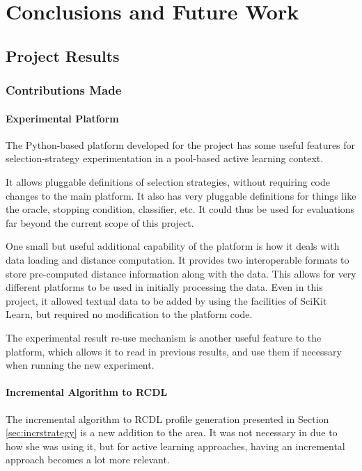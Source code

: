 \documentclass[a4paper,11pt]{report}
\begin{document}
\chapter{Conclusions and Future Work\label{cha:conclusions}}

\section{Project Results}
\subsection{Contributions Made}
\subsubsection{Experimental Platform}
The Python-based platform developed for the project has some useful features for selection-strategy experimentation in a pool-based active learning context.

It allows pluggable definitions of selection strategies, without requiring code changes to the main platform. It also has very pluggable definitions for things like the oracle, stopping condition, classifier, etc. It could thus be used for evaluations far beyond the current scope of this project.

One small but useful additional capability of the platform is how it deals with data loading and distance computation. It provides two interoperable formats to store pre-computed distance information along with the data. This allows for very different platforms to be used in initially processing the data. Even in this project, it allowed textual data to be added by using the facilities of SciKit Learn, but required no modification to the platform code.

The experimental result re-use mechanism is another useful feature to the platform, which allows it to read in previous results, and use them if necessary when running the new experiment.  

\subsubsection{Incremental Algorithm to RCDL}

The incremental algorithm to RCDL profile generation presented in Section \ref{sec:incrstrategy} is a new addition to the area. It was not necessary in \citet{Delany2009} due to how she was using it, but for active learning approaches, having an incremental approach becomes a lot more relevant. 
\end{document}
